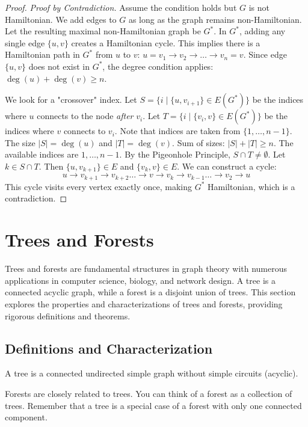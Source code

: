 \documentclass[oneside]{book}
\begin{document}
\begin{proof}
\textit{Proof by Contradiction.}
Assume the condition holds but $G$ is not Hamiltonian. We add edges to $G$ as long as the graph remains non-Hamiltonian. Let the resulting maximal non-Hamiltonian graph be $G^*$.
In $G^*$, adding any single edge $\{u, v\}$ creates a Hamiltonian cycle. This implies there is a Hamiltonian path in $G^*$ from $u$ to $v$: $u = v_1 \to v_2 \to \dots \to v_n = v$.
Since edge $\{u, v\}$ does not exist in $G^*$, the degree condition applies: $\deg(u) + \deg(v) \ge n$.

We look for a "crossover" index. Let $S = \{i \mid \{u, v_{i+1}\} \in E(G^*)\}$ be the indices where $u$ connects to the node \textit{after} $v_i$.
Let $T = \{i \mid \{v_i, v\} \in E(G^*)\}$ be the indices where $v$ connects to $v_i$.
Note that indices are taken from $\{1, \dots, n-1\}$.
The size $|S| = \deg(u)$ and $|T| = \deg(v)$.
Sum of sizes: $|S| + |T| \ge n$.
The available indices are $1, \dots, n-1$. By the Pigeonhole Principle, $S \cap T \neq \emptyset$.
Let $k \in S \cap T$. Then $\{u, v_{k+1}\} \in E$ and $\{v_k, v\} \in E$.
We can construct a cycle:
\[ u \to v_{k+1} \to v_{k+2} \dots \to v \to v_k \to v_{k-1} \dots \to v_2 \to u \]
This cycle visits every vertex exactly once, making $G^*$ Hamiltonian, which is a contradiction.
\end{proof}

\section{Trees and Forests}

Trees and forests are fundamental structures in graph theory with numerous applications in computer science, biology, and network design. A tree is a connected acyclic graph, while a forest is a disjoint union of trees. This section explores the properties and characterizations of trees and forests, providing rigorous definitions and theorems.

\subsection{Definitions and Characterization}

\begin{definition}[Trees]
A tree is a connected undirected simple graph without simple circuits (acyclic).
\end{definition}

Forests are closely related to trees. You can think of a forest as a collection of trees. Remember that a tree is a special case of a forest with only one connected component.
\end{document}
